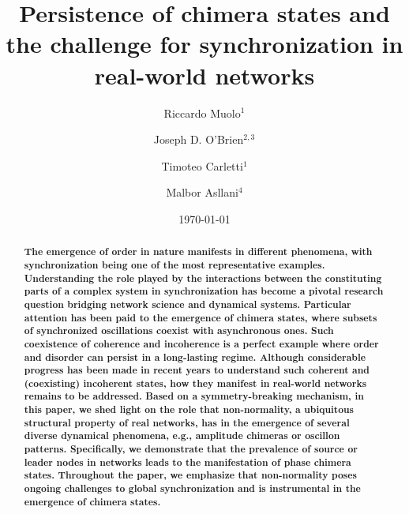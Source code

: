 \documentclass[prx,twocolumn,amsmath,noshowkeys,noshowpacs,amssymb]{revtex4-2}
\begin{document}
\title{{Persistence of chimera states and the challenge for synchronization in real-world networks}}

\author{Riccardo Muolo$^1$}

\author{Joseph D. O'Brien$^{2,3}$}


\author{Timoteo Carletti$^1$}

\author{Malbor Asllani$^4$}		







\date{\today} %


\begin{abstract} 
\textbf{The emergence of order in nature manifests in different phenomena, with synchronization being one of the most representative examples. Understanding the role played by the interactions between the constituting parts of a complex system in synchronization has become a pivotal research question bridging network science and dynamical systems. Particular attention has been paid to the emergence of chimera states, where subsets of synchronized oscillations coexist with {asynchronous ones}. Such coexistence of coherence and incoherence is a perfect example where order and disorder can persist in a long-lasting regime. Although considerable progress has been made in recent years to understand such coherent and (coexisting) incoherent states, how they manifest in real-world networks remains to be addressed. Based on a symmetry-breaking mechanism, in this paper, we shed light on the {role that non-normality, a ubiquitous} structural property of real networks{, has in} the emergence of {several diverse dynamical phenomena, e.g., amplitude chimeras or oscillon patterns}. {Specifically, we demonstrate that the prevalence of source or leader nodes in networks leads to the manifestation of phase chimera states. Throughout the paper, we emphasize that non-normality poses ongoing challenges to global synchronization and is instrumental in the emergence of chimera states.}}
\end{abstract}
\end{document}
